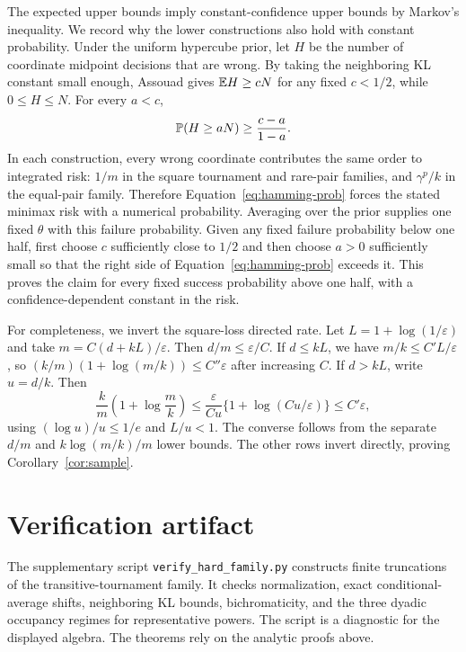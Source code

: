 The expected upper bounds imply constant-confidence upper bounds by Markov's inequality. We record why the lower constructions also hold with constant probability. Under the uniform hypercube prior, let $H$ be the number of coordinate midpoint decisions that are wrong. By taking the neighboring KL constant small enough, Assouad gives $\mathbb E H\geq cN$ for any fixed $c<1/2$, while $0\leq H\leq N$. For every $a<c$,
\begin{equation}
\mathbb P(H\geq aN)\geq\frac{c-a}{1-a}. \label{eq:hamming-prob}
\end{equation}
In each construction, every wrong coordinate contributes the same order to integrated risk: $1/m$ in the square tournament and rare-pair families, and $\gamma^p/k$ in the equal-pair family. Therefore Equation~\eqref{eq:hamming-prob} forces the stated minimax risk with a numerical probability. Averaging over the prior supplies one fixed $\theta$ with this failure probability. Given any fixed failure probability below one half, first choose $c$ sufficiently close to $1/2$ and then choose $a>0$ sufficiently small so that the right side of Equation~\eqref{eq:hamming-prob} exceeds it. This proves the claim for every fixed success probability above one half, with a confidence-dependent constant in the risk.

For completeness, we invert the square-loss directed rate. Let $L=1+\log(1/\varepsilon)$ and take $m=C(d+kL)/\varepsilon$. Then $d/m\leq\varepsilon/C$. If $d\leq kL$, we have $m/k\leq C'L/\varepsilon$, so $(k/m)(1+\log(m/k))\leq C''\varepsilon$ after increasing $C$. If $d>kL$, write $u=d/k$. Then
\[
\frac{k}{m}\left(1+\log\frac{m}{k}\right)
\leq\frac{\varepsilon}{Cu}\{1+\log(Cu/\varepsilon)\}
\leq C'\varepsilon,
\]
using $(\log u)/u\leq1/e$ and $L/u<1$. The converse follows from the separate $d/m$ and $k\log(m/k)/m$ lower bounds. The other rows invert directly, proving Corollary~\ref{cor:sample}.

\section{Verification artifact}
\label{app:artifact}

The supplementary script \texttt{verify\_hard\_family.py} constructs finite truncations of the transitive-tournament family. It checks normalization, exact conditional-average shifts, neighboring KL bounds, bichromaticity, and the three dyadic occupancy regimes for representative powers. The script is a diagnostic for the displayed algebra. The theorems rely on the analytic proofs above.
